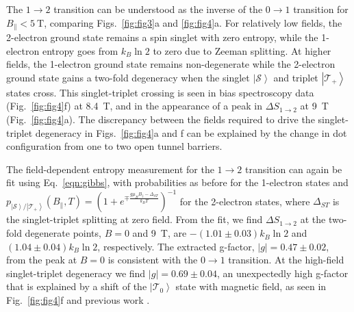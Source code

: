 \documentclass[twocolumn,showpacs,amsmath,amssymb,prl,aps,superscriptaddress]{revtex4-1}
\newcommand{\ket}[1]{\ensuremath{\left|#1\right\rangle}}
\begin{document}
The $1\rightarrow 2$ transition can be understood as the inverse of the $0 \rightarrow 1$ transition for $B_\parallel < \SI{5}{\tesla}$, comparing Figs.~\ref{fig:fig3}a and \ref{fig:fig4}a. For relatively low fields, the 2-electron ground state remains a spin singlet with zero entropy, while the 1-electron entropy goes from $k_B\ln{2}$ to zero due to Zeeman splitting.  At higher fields, the 1-electron ground state remains non-degenerate while the 2-electron ground state gains a two-fold degeneracy when the singlet $\ket{\mathcal{S}}$ and triplet \ket{\mathcal{T_{+}}} states cross.  This singlet-triplet crossing is seen in bias spectroscopy data (Fig.~\ref{fig:fig4}f) at \SI{8.4}{\tesla}, and in the appearance of a peak in $\Delta S_{1\rightarrow 2}$ at \SI{9}{\tesla} (Fig.~\ref{fig:fig4}a).  The discrepancy between the fields required to drive the singlet-triplet degeneracy in Figs.~\ref{fig:fig4}a and f can be explained by the change in dot configuration from one to two open tunnel barriers.

The field-dependent entropy measurement for the $1 \rightarrow 2$ transition can again be fit using Eq.~\ref{eqn:gibbs}, with probabilities as before for the 1-electron states and $p_{\ket{\mathcal{S}}/\ket{\mathcal{T_{+}}}}(B_\parallel, T) = (1+ e^{\mp \frac{g\mu_B B_\parallel - \Delta_{ST}}{k_B T}})^{-1}$ for the 2-electron states, where $\Delta_{ST}$ is the singlet-triplet splitting at zero field. From the fit, we find $\Delta S_{1\rightarrow 2}$ at the two-fold degenerate points, $B=0$ and \SI{9}{\tesla}, are $-(1.01\pm0.03) k_B \ln{2}$ and $(1.04 \pm 0.04) k_B \ln{2}$, respectively. The extracted g-factor, $|g| = 0.47 \pm 0.02$, from the peak at $B=0$ is consistent with the $0\rightarrow 1$ transition.  At the high-field singlet-triplet degeneracy we find $|g| = 0.69 \pm 0.04$, an unexpectedly high g-factor that is explained by a shift of the $\ket{\mathcal{T_0}}$ state with magnetic field, as seen in Fig.~\ref{fig:fig4}f and previous work \cite{Szafran2004}.  
\end{document}
